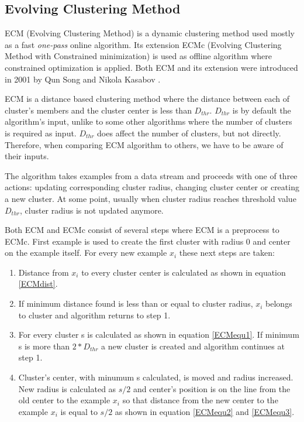 \documentclass[conference]{IEEEtran}
\begin{document}
\subsection{Evolving Clustering Method}

ECM (Evolving Clustering Method) is a dynamic clustering method used mostly as a fast \textit{one-pass} online algorithm. %
Its extension ECMc (Evolving Clustering Method with Constrained minimization) is used as offline algorithm where constrained optimization
is applied. Both ECM and its extension were introduced in 2001 by Qun Song and Nikola Kasabov \cite{song01}.

ECM is a distance based clustering method where the distance between each of cluster's members and the cluster center is less than $D_{thr}$.%
$D_{thr}$ is by default the algorithm's input, unlike to some other algorithms where the number of clusters is required as
input. $D_{thr}$ does affect the number of clusters, but not directly. Therefore, when comparing ECM algorithm to
others, we have to be aware of their inputs.

The algorithm takes examples from a data stream and proceeds with one of three actions: updating corresponding cluster radius, changing
cluster center or creating a new cluster.
At some point, usually when cluster radius reaches threshold value $D_{thr}$, cluster radius
is not updated anymore.

Both ECM and ECMc consist of several steps where ECM is a preprocess to ECMc. First example is used to create the first cluster
with radius 0 and center on the example itself. For every new example $x_i$ these next steps are taken:
\begin{enumerate}
	\item Distance from $x_i$ to every cluster center is calculated as shown in equation \ref{ECMdist}.
	\item If minimum distance found is less than or equal to cluster radius, $x_i$ belongs to cluster and algorithm returns to step 1.
	\item For every cluster s is calculated as shown in equation \ref{ECMequ1}. If minimum s is more than $2*D_{thr}$ a new cluster
		is created and algorithm continues at step 1.
	\item Cluster's center, with minumum s calculated, is moved and radius increased. New radius is calculated as $s/2$ and
		center's position is on the line from the old center to the example $x_i$ so that distance from the new center to the example $x_i$ is
		equal to $s/2$ as shown in equation \ref{ECMequ2} and \ref{ECMequ3}.
\end{enumerate}
\end{document}
